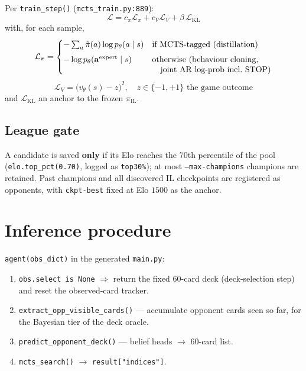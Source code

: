 \documentclass[11pt,a4paper]{article}
\newcommand{\code}[1]{\texttt{\small #1}}
\newcommand{\file}[1]{\texttt{\small #1}}
\begin{document}
Per \code{train\_step()} (\file{mcts\_train.py:889}):
\begin{equation*}
\mathcal{L} = c_\pi \mathcal{L}_\pi + c_V \mathcal{L}_V + \beta\, \mathcal{L}_{\text{KL}}
\end{equation*}
with, for each sample,
\begin{equation*}
\mathcal{L}_\pi =
\begin{cases}
-\sum_{a} \tilde{\pi}(a) \log p_\theta(a \mid s) & \text{if MCTS-tagged (distillation)} \\[0.4em]
-\log p_\theta(\mathbf{a}^{\text{expert}} \mid s) & \text{otherwise (behaviour cloning,} \\[-0.2em]
 & \text{\quad joint AR log-prob incl.\ STOP)}
\end{cases}
\end{equation*}
\begin{equation*}
\mathcal{L}_V = \big(v_\theta(s) - z\big)^2, \quad z \in \{-1,+1\} \text{ the game outcome}
\end{equation*}
and $\mathcal{L}_{\text{KL}}$ an anchor to the frozen $\pi_{\text{IL}}$.

\subsection{League gate}

A candidate is saved \textbf{only} if its Elo reaches the $70$th percentile of
the pool (\code{elo.top\_pct(0.70)}, logged as \code{top30\%}); at most
\code{--max-champions} champions are retained. Past champions and all
discovered IL checkpoints are registered as opponents, with \code{ckpt-best}
fixed at Elo $1500$ as the anchor.

\section{Inference procedure}
\label{sec:inference}

\code{agent(obs\_dict)} in the generated \file{main.py}:

\begin{enumerate}[leftmargin=*]
  \item \code{obs.select is None} $\Rightarrow$ return the fixed $60$-card deck
    (deck-selection step) and reset the observed-card tracker.
  \item \code{extract\_opp\_visible\_cards()} --- accumulate opponent cards
    seen so far, for the Bayesian tier of the deck oracle.
  \item \code{predict\_opponent\_deck()} --- belief heads $\to$ $60$-card list.
  \item \code{mcts\_search()} $\to$ \code{result["indices"]}.
\end{enumerate}
\end{document}
